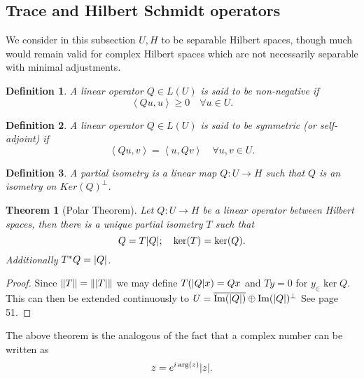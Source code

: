 \documentclass[12pt]{article}
\newtheorem{theorem}{Theorem}
\newtheorem{definition}{Definition}
\newcommand{\br}[1]{\left\langle#1\right\rangle}
\begin{document}
\subsection{Trace and Hilbert Schmidt operators}
We consider in this subsection $U,H$ to be separable Hilbert spaces, though much would remain valid for complex Hilbert spaces which are not necessarily separable with minimal adjustments.
\begin{definition}
	A linear operator $Q\in L(U)$ is said to be non-negative if
	\begin{equation*}
		\br{Qu,u}\geq 0\quad\forall u\in U.
	\end{equation*}
\end{definition}
\begin{definition}
	A linear operator $Q\in L(U)$ is said to be symmetric (or self-adjoint) if
	\begin{equation*}
		\br{Qu,v}=\br{u,Qv}\quad\forall u,v\in U.
	\end{equation*}
\end{definition}
\begin{definition}
	A partial isometry is a linear map $Q:U\to H$ such that $Q$ is an isometry on $Ker(Q)^\perp$.
\end{definition}
\begin{theorem}[Polar Theorem]
	Let $Q:U\to H$ be a linear operator between Hilbert spaces, then there is a unique partial isometry $T$ such that
	\begin{equation*}
		Q=T\abs{Q};\quad \ker(T)=\ker(Q).
	\end{equation*}
	Additionally $T^*Q=\abs{Q}$.
\end{theorem}
\begin{proof}
	Since $\norm{T}=\norm{\abs{T}}$ we may define $T(\abs{Q}x)=Qx$ and  $Ty=0$ for  $y_\in \ker{Q}$. This can then be extended continuously to $U=\overline{\Im(\abs{Q})}\oplus \Im(\abs{Q})^\perp$   See \cite{murphy2014c} page 51.
\end{proof}

The above theorem is the analogous of the fact that a complex number can be written as
\begin{equation*}
	z=e^{i\arg(z)}\abs{z}.
\end{equation*}
\end{document}
